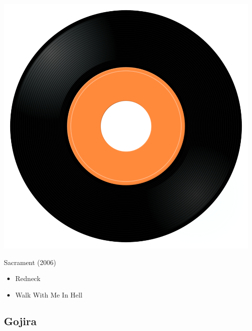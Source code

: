 \begin{minipage}[t]{0.25\textwidth}\vspace{0pt}
\captionsetup{type=figure}
\includegraphics[width=\textwidth]{Images/cover.png}
\caption*{Sacrament (2006)}
\end{minipage}
\begin{minipage}[t]{0.25\textwidth}\vspace{0pt}
\begin{itemize}[nosep,leftmargin=1em,labelwidth=*,align=left]
	\setlength{\itemsep}{0pt}
	\item Redneck
	\item Walk With Me In Hell
\end{itemize}
\end{minipage}

\subsection{Gojira}

